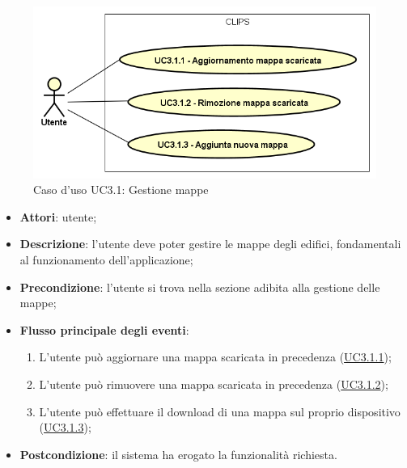 \documentclass[../AnalisiDeiRequisiti.tex]{subfiles}
\begin{document}
        \begin{figure}[!h]
            \centering
            \includegraphics[scale=0.95, width=\textwidth]{img/UC3-1.png}
            \caption{Caso d'uso UC3.1: Gestione mappe}\label{fig:UC3.1} 
        \end{figure}
\begin{itemize}
\item \textbf{Attori}: utente;
\item \textbf{Descrizione}: l'utente deve poter gestire le mappe degli edifici, fondamentali al funzionamento dell'applicazione; 
      \item \textbf{Precondizione}: l'utente si trova nella sezione adibita alla gestione delle mappe;

        \item \textbf{Flusso principale degli eventi}:
          \begin{enumerate}
          \item L'utente può aggiornare una mappa scaricata in precedenza (\hyperlink{UC3.1.1}{UC3.1.1});
          \item L'utente può rimuovere una mappa scaricata in precedenza (\hyperlink{UC3.1.2}{UC3.1.2});
          \item L'utente può effettuare il download di una mappa sul proprio dispositivo (\hyperlink{UC3.1.3}{UC3.1.3});

      \end{enumerate}
    \item \textbf{Postcondizione}: il sistema ha erogato la funzionalità richiesta.
  \end{itemize}
\hypertarget{UC3.1.1}{}
\end{document}
